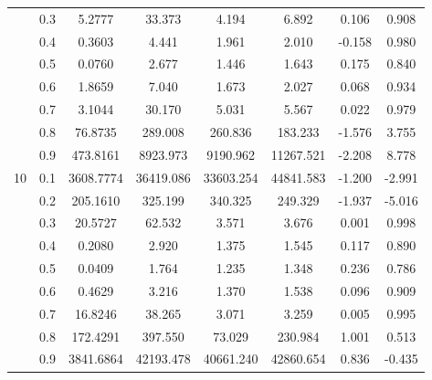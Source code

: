 \documentclass[11pt,a4paper]{report}
\begin{document}
\begin{longtable}{ | c | c || c | c | c | c | c | c | }
 & 0.3 & 5.2777 & 33.373 & 4.194 & 6.892 & 0.106 & 0.908 \\
 & 0.4 & 0.3603 & 4.441 & 1.961 & 2.010 & -0.158 & 0.980 \\
 & 0.5 & 0.0760 & 2.677 & 1.446 & 1.643 & 0.175 & 0.840 \\
 & 0.6 & 1.8659 & 7.040 & 1.673 & 2.027 & 0.068 & 0.934 \\
 & 0.7 & 3.1044 & 30.170 & 5.031 & 5.567 & 0.022 & 0.979 \\
 & 0.8 & 76.8735 & 289.008 & 260.836 & 183.233 & -1.576 & 3.755 \\
 & 0.9 & 473.8161 & 8923.973 & 9190.962 & 11267.521 & -2.208 & 8.778 \\
 \hline
\multirow{9}{*}{10} & 0.1 & 3608.7774 & 36419.086 & 33603.254 & 44841.583 & -1.200 & -2.991 \\
 & 0.2 & 205.1610 & 325.199 & 340.325 & 249.329 & -1.937 & -5.016 \\
 & 0.3 & 20.5727 & 62.532 & 3.571 & 3.676 & 0.001 & 0.998 \\
 & 0.4 & 0.2080 & 2.920 & 1.375 & 1.545 & 0.117 & 0.890 \\
 & 0.5 & 0.0409 & 1.764 & 1.235 & 1.348 & 0.236 & 0.786 \\
 & 0.6 & 0.4629 & 3.216 & 1.370 & 1.538 & 0.096 & 0.909 \\
 & 0.7 & 16.8246 & 38.265 & 3.071 & 3.259 & 0.005 & 0.995 \\
 & 0.8 & 172.4291 & 397.550 & 73.029 & 230.984 & 1.001 & 0.513 \\
 & 0.9 & 3841.6864 & 42193.478 & 40661.240 & 42860.654 & 0.836 & -0.435 \\
 \hline
\hline
\end{longtable}
\end{document}
